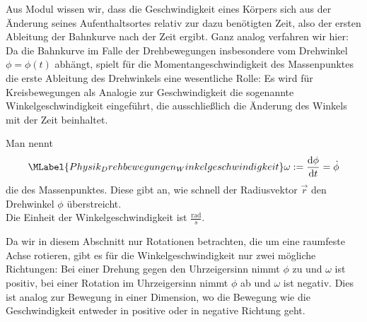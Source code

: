 \begin{MContent}

Aus Modul  wissen wir, dass die Geschwindigkeit eines K\"orpers sich aus der \"Anderung seines Aufenthaltsortes relativ zur dazu ben\"otigten Zeit, also der ersten Ableitung der Bahnkurve nach der Zeit ergibt. Ganz analog verfahren wir hier: Da die Bahnkurve im Falle der Drehbewegungen insbesondere vom Drehwinkel $\phi=\phi(t)$ abh\"angt, spielt f\"ur die Momentangeschwindigkeit des Massenpunktes die erste Ableitung des Drehwinkels eine wesentliche Rolle: Es wird f\"ur Kreisbewegungen als Analogie zur Geschwindigkeit die sogenannte Winkelgeschwindigkeit eingef\"uhrt, die ausschlie{\ss}lich die \"Anderung des Winkels mit der Zeit beinhaltet.

\begin{MInfo}
Man nennt
\begin{equation}\MLabel{Physik_Drehbewegungen_Winkelgeschwindigkeit}
\omega:=\frac{\text{d}\phi}{\text{d}t}=\dot{\phi}
\end{equation}die  des Massenpunktes. Diese gibt an, wie schnell der Radiusvektor $\vec{r}$ den Drehwinkel $\phi$ \"uberstreicht.\\
Die Einheit der Winkelgeschwindigkeit ist $\frac{\text{rad}}{s}$.
\end{MInfo}

Da wir in diesem Abschnitt nur Rotationen betrachten, die um eine raumfeste Achse rotieren, gibt es f\"ur die Winkelgeschwindigkeit nur zwei m\"ogliche Richtungen: Bei einer Drehung gegen den Uhrzeigersinn nimmt $\phi$ zu und $\omega$ ist positiv, bei einer Rotation im Uhrzeigersinn nimmt $\phi$ ab und $\omega$ ist negativ. Dies ist analog zur Bewegung in einer Dimension, wo die Bewegung wie die Geschwindigkeit entweder in positive oder in negative Richtung geht. \\


\end{MContent}
